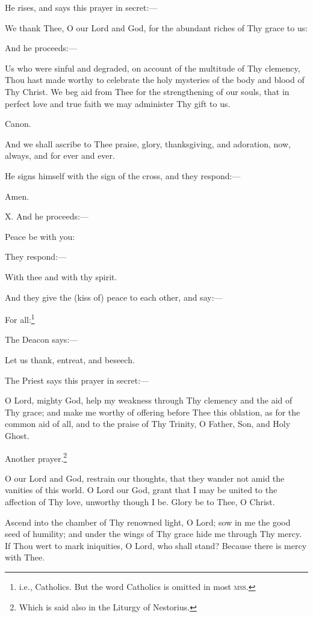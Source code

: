 He rises, and says this prayer in secret:—

We thank Thee, O our Lord and God, for the abundant riches of Thy grace to us:

And he proceeds:—

Us who were sinful and degraded, on account of the multitude of Thy clemency, Thou hast made worthy to celebrate the holy mysteries of the body and blood of Thy Christ. We beg aid from Thee for the strengthening of our souls, that in perfect love and true faith we may administer Thy gift to us.

Canon.

And we shall ascribe to Thee praise, glory, thanksgiving, and adoration, now, always, and for ever and ever.

He signs himself with the sign of the cross, and they respond:—

Amen.

X. And he proceeds:—

Peace be with you:

They respond:—

With thee and with thy spirit.

And they give the (kiss of) peace to each other, and say:—

For all:\footnote{\par  i.e., Catholics. But the word Catholics is omitted in most \textsc{mss}.}

The Deacon says:—

Let us thank, entreat, and beseech.

The Priest says this prayer in secret:—

O Lord, mighty God, help my weakness through Thy clemency and the aid of Thy grace; and make me worthy of offering before Thee this oblation, as for the common aid of all, and to the praise of Thy Trinity, O Father, Son, and Holy Ghost.

Another prayer.\footnote{\par  Which is said also in the Liturgy of Nestorius.}

O our Lord and God, restrain our thoughts, that they wander not amid the vanities of this world. O Lord our God, grant that I may be united to the affection of Thy love, unworthy though I be. Glory be to Thee, O Christ.

Ascend into the chamber of Thy renowned light, O Lord; sow in me the good seed of humility; and under the wings of Thy grace hide me through Thy mercy. If Thou wert to mark iniquities, O Lord, who shall stand? Because there is mercy with Thee.

